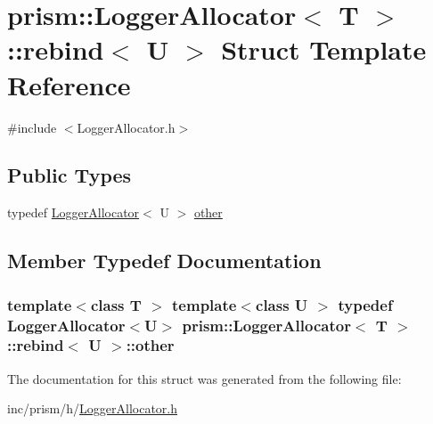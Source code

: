 \hypertarget{structprism_1_1_logger_allocator_1_1rebind}{}\section{prism\+:\+:Logger\+Allocator$<$ T $>$\+:\+:rebind$<$ U $>$ Struct Template Reference}
\label{structprism_1_1_logger_allocator_1_1rebind}


{\ttfamily \#include $<$Logger\+Allocator.\+h$>$}

\subsection*{Public Types}
\begin{DoxyCompactItemize}
\item 
typedef \hyperlink{classprism_1_1_logger_allocator}{Logger\+Allocator}$<$ U $>$ \hyperlink{structprism_1_1_logger_allocator_1_1rebind_aba935f99abb34d58ffba123224838c15}{other}
\end{DoxyCompactItemize}


\subsection{Member Typedef Documentation}
\subsubsection[{\texorpdfstring{other}{other}}]{\setlength{\rightskip}{0pt plus 5cm}template$<$class T $>$ template$<$class U $>$ typedef {\bf Logger\+Allocator}$<$U$>$ {\bf prism\+::\+Logger\+Allocator}$<$ T $>$\+::{\bf rebind}$<$ U $>$\+::{\bf other}}\hypertarget{structprism_1_1_logger_allocator_1_1rebind_aba935f99abb34d58ffba123224838c15}{}\label{structprism_1_1_logger_allocator_1_1rebind_aba935f99abb34d58ffba123224838c15}


The documentation for this struct was generated from the following file\+:\begin{DoxyCompactItemize}
\item 
inc/prism/h/\hyperlink{_logger_allocator_8h}{Logger\+Allocator.\+h}\end{DoxyCompactItemize}
